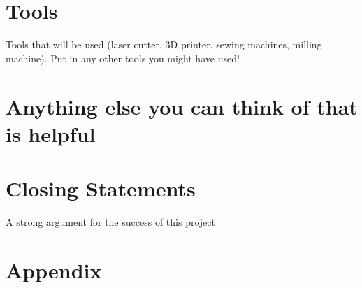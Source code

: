 \documentclass[12pt]{article}
\begin{document}
\newpage
\section{Tools}
Tools that will be used (laser cutter, 3D printer, sewing machines, milling machine). 
Put in any other tools you might have used!

\newpage
\section{Anything else you can think of that is helpful}

\newpage
\section{Closing Statements}
A strong argument for the success of this project
 
\newpage

\section{Appendix}

\end{document}
